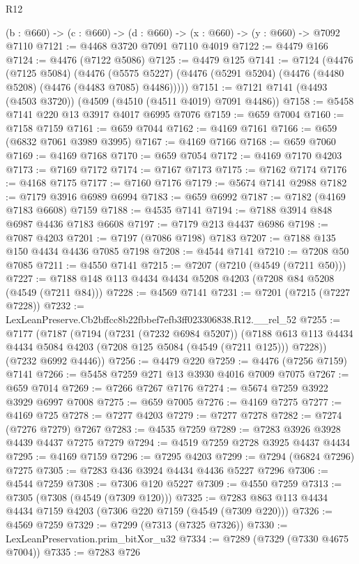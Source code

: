 \begin{lexlean}{R12}
\begin{coremodule}
  (b : @660) -> (c : @660) -> (d : @660) -> (x : @660) -> (y : @660) -> @7092 @7110
@7121 := @4468 @3720 @7091 @7110 @4019
@7122 := @4479 @166
@7124 := @4476 (@7122 @5086)
@7125 := @4479 @125
@7141 := @7124
    (@4476
      (@7125 @5084)
      (@4476 (@5575 @5227) (@4476 (@5291 @5204) (@4476 (@4480 @5208) (@4476 (@4483 @7085) @4486)))))
@7151 := @7121 @7141 (@4493 (@4503 @3720)) (@4509 (@4510 (@4511 @4019) @7091 @4486))
@7158 := @5458 @7141 @220 @13 @3917 @4017 @6995 @7076
@7159 := @659 @7004
@7160 := @7158 @7159
@7161 := @659 @7044
@7162 := @4169 @7161
@7166 := @659 (@6832 @7061 @3989 @3995)
@7167 := @4169 @7166
@7168 := @659 @7060
@7169 := @4169 @7168
@7170 := @659 @7054
@7172 := @4169 @7170 @4203
@7173 := @7169 @7172
@7174 := @7167 @7173
@7175 := @7162 @7174
@7176 := @4168 @7175
@7177 := @7160 @7176
@7179 := @5674 @7141 @2988
@7182 := @7179 @3916 @6989 @6994
@7183 := @659 @6992
@7187 := @7182 (@4169 @7183 @6608) @7159
@7188 := @4535 @7141
@7194 := @7188 @3914 @848 @6987 @4436 @7183 @6608
@7197 := @7179 @213 @4437 @6986
@7198 := @7087 @4203
@7201 := @7197 (@7086 @7198) @7183
@7207 := @7188 @135 @150 @4434 @4436 @7085 @7198
@7208 := @4544 @7141
@7210 := @7208 @50 @7085
@7211 := @4550 @7141
@7215 := @7207 (@7210 (@4549 (@7211 @50)))
@7227 := @7188 @148 @113 @4434 @4434 @5208 @4203 (@7208 @84 @5208 (@4549 (@7211 @84)))
@7228 := @4569 @7141
@7231 := @7201 (@7215 (@7227 @7228))
@7232 := LexLeanPreserve.Cb2bffcc8b22fbbef7efb3ff023306838.R12.__rel_52
@7255 := @7177
    (@7187
      (@7194
        (@7231 (@7232 @6984 @5207))
        (@7188 @613 @113 @4434 @4434 @5084 @4203 (@7208 @125 @5084 (@4549 (@7211 @125))) @7228))
      (@7232 @6992 @4446))
@7256 := @4479 @220
@7259 := @4476 (@7256 @7159) @7141
@7266 := @5458 @7259 @271 @13 @3930 @4016 @7009 @7075
@7267 := @659 @7014
@7269 := @7266 @7267 @7176
@7274 := @5674 @7259 @3922 @3929 @6997 @7008
@7275 := @659 @7005
@7276 := @4169 @7275
@7277 := @4169 @725
@7278 := @7277 @4203
@7279 := @7277 @7278
@7282 := @7274 (@7276 @7279) @7267
@7283 := @4535 @7259
@7289 := @7283 @3926 @3928 @4439 @4437 @7275 @7279
@7294 := @4519 @7259 @2728 @3925 @4437 @4434
@7295 := @4169 @7159
@7296 := @7295 @4203
@7299 := @7294 (@6824 @7296) @7275
@7305 := @7283 @436 @3924 @4434 @4436 @5227 @7296
@7306 := @4544 @7259
@7308 := @7306 @120 @5227
@7309 := @4550 @7259
@7313 := @7305 (@7308 (@4549 (@7309 @120)))
@7325 := @7283 @863 @113 @4434 @4434 @7159 @4203 (@7306 @220 @7159 (@4549 (@7309 @220)))
@7326 := @4569 @7259
@7329 := @7299 (@7313 (@7325 @7326))
@7330 := LexLeanPreservation.prim_bitXor_u32
@7334 := @7289 (@7329 (@7330 @4675 @7004))
@7335 := @7283 @726

\end{coremodule}
\end{lexlean}
